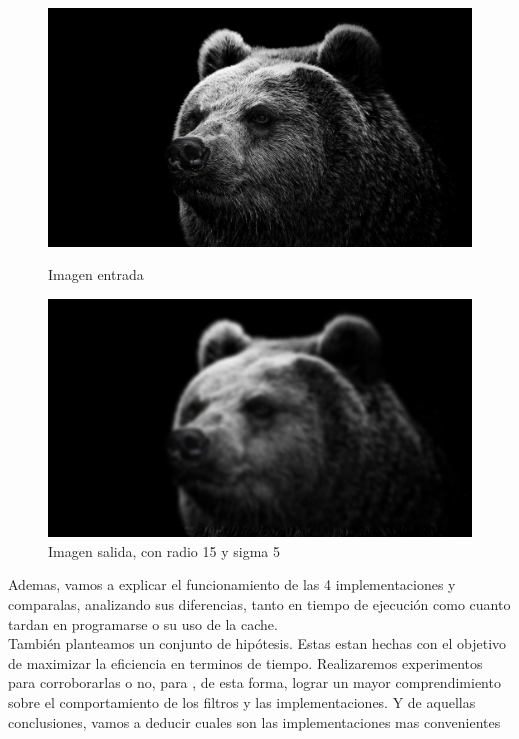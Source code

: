 \begin{figure}[H]
\begin{center}

  \includegraphics[width=\linewidth]{img/sd(1).png}
  \caption{{\small Imagen entrada}} \label{c}
\endminipage

  \includegraphics[width=\linewidth]{img/sd.png}
  \caption{{\small Imagen salida, con radio 15 y sigma 5}} \label{c}
\endminipage

\end{center}
\end{figure}

Ademas, vamos a explicar el funcionamiento de las 4 implementaciones y comparalas, analizando sus diferencias, tanto en tiempo de ejecución como cuanto tardan en programarse o su uso de la cache. \\
También planteamos un conjunto de hipótesis. Estas estan hechas con el objetivo de maximizar la eficiencia en terminos de tiempo. Realizaremos experimentos para corroborarlas o no, para , de esta forma, lograr un mayor comprendimiento sobre el comportamiento de los filtros y las implementaciones. Y de aquellas conclusiones, vamos a deducir cuales son las implementaciones mas convenientes  \\

